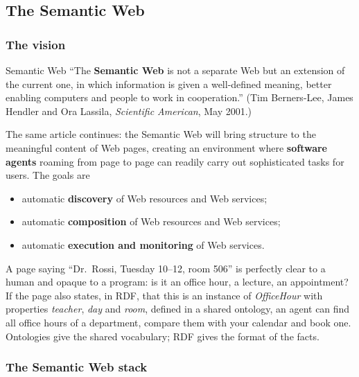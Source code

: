 \subsection{The Semantic Web}
\label{sec:semantic-web}

\subsubsection{The vision}

\begin{nbdef}{Semantic Web}
``The \textbf{Semantic Web} is not a separate Web but an extension of the current one,
in which information is given a well-defined meaning, better enabling computers and
people to work in cooperation.'' (Tim Berners-Lee, James Hendler and Ora Lassila,
\emph{Scientific American}, May 2001.)
\end{nbdef}

The same article continues: the Semantic Web will bring structure to the meaningful
content of Web pages, creating an environment where \textbf{software agents} roaming
from page to page can readily carry out sophisticated tasks for users. The goals are
\begin{itemize}[nosep]
  \item automatic \textbf{discovery} of Web resources and Web services;
  \item automatic \textbf{composition} of Web resources and Web services;
  \item automatic \textbf{execution and monitoring} of Web services.
\end{itemize}

\begin{nbintuition}
A page saying ``Dr.\ Rossi, Tuesday 10--12, room 506'' is perfectly clear to a human
and opaque to a program: is it an office hour, a lecture, an appointment? If the page
also states, in RDF, that this is an instance of \emph{OfficeHour} with properties
\emph{teacher}, \emph{day} and \emph{room}, defined in a shared ontology, an agent can
find all office hours of a department, compare them with your calendar and book one.
Ontologies give the shared vocabulary; RDF gives the format of the facts.
\end{nbintuition}

\subsubsection{The Semantic Web stack}

